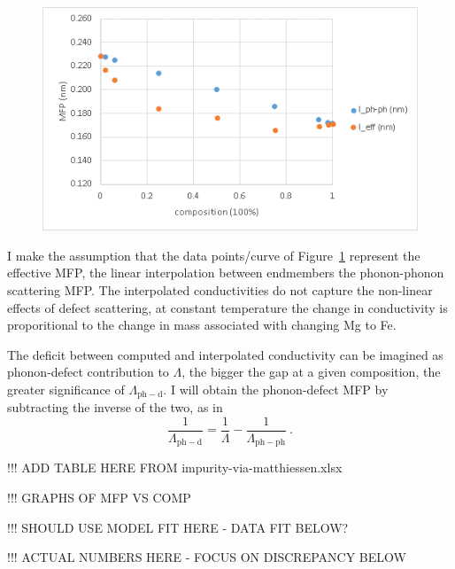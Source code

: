 \begin{figure}[h!]
  \includegraphics[width=\linewidth]{Figures/kc_4000_mfp_norm.png}
  \caption[kc 4000 mfp norm]{}
  \label{kc_4000_mfp_norm}
\end{figure}

I make the assumption that the data points/curve of Figure~\ref{kc_4000_mfp_norm} represent the effective MFP, the linear interpolation between endmembers the phonon-phonon scattering MFP. The interpolated conductivities do not capture the non-linear effects of defect scattering, at constant temperature the change in conductivity is proporitional to the change in mass associated with changing Mg to Fe.

The deficit between computed and interpolated conductivity can be imagined as phonon-defect contribution to $\Lambda$, the bigger the gap at a given composition, the greater significance of $\Lambda_{\mathrm{ph-d}}$. I will obtain the phonon-defect MFP by subtracting the inverse of the two, as in 
%
\begin{equation}
\frac{1}{\Lambda_{\mathrm{ph-d}}}=\frac{1}{\Lambda}-\frac{1}{\Lambda_{\mathrm{ph-ph}}}\ .
\label{eq:matth_mfp_mod2}
\end{equation}

!!! ADD TABLE HERE FROM impurity-via-matthiessen.xlsx

!!! GRAPHS OF MFP VS COMP

!!! SHOULD USE MODEL FIT HERE - DATA FIT BELOW?

!!! ACTUAL NUMBERS HERE - FOCUS ON DISCREPANCY BELOW



%
%



